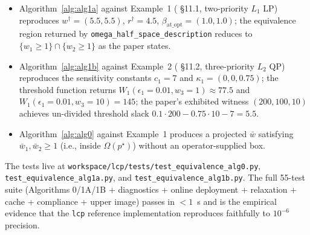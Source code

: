 \begin{itemize}[leftmargin=*]
    \item Algorithm~\ref{alg:alg1a} against Example~1 (\cite{lcp2025} \S11.1, two-priority $L_1$ LP) reproduces $w^{\dagger} = (5.5, 5.5)$, $r^{\dagger} = 4.5$, $\beta_{\mathrm{at\_opt}} = (1.0, 1.0)$; the equivalence region returned by \texttt{omega\_half\_space\_description} reduces to $\{w_1 \ge 1\} \cap \{w_2 \ge 1\}$ as the paper states.
    \item Algorithm~\ref{alg:alg1b} against Example~2 (\cite{lcp2025} \S11.2, three-priority $L_2$ QP) reproduces the sensitivity constants $c_1 = 7$ and $\kappa_1 = (0, 0, 0.75)$; the threshold function returns $W_1(\epsilon_1 = 0.01, w_3 = 1) \approx 77.5$ and $W_1(\epsilon_1 = 0.01, w_3 = 10) = 145$; the paper's exhibited witness $(200, 100, 10)$ achieves un-divided threshold slack $0.1 \cdot 200 - 0.75 \cdot 10 - 7 = 5.5$.
    \item Algorithm~\ref{alg:alg0} against Example~1 produces a projected $\bar w$ satisfying $\bar w_1, \bar w_2 \ge 1$ (i.e., inside $\Omega(p^\star)$) without an operator-supplied box.
\end{itemize}

The tests live at \texttt{workspace/lcp/tests/test\_equivalence\_alg0.py}, \texttt{test\_equivalence\_alg1a.py}, and \texttt{test\_equivalence\_alg1b.py}. The full 55-test suite (Algorithms 0/1A/1B + diagnostics + online deployment + relaxation + cache + compliance + upper image) passes in $< 1$~s and is the empirical evidence that the \texttt{lcp} reference implementation reproduces \cite{lcp2025} faithfully to $10^{-6}$ precision.
